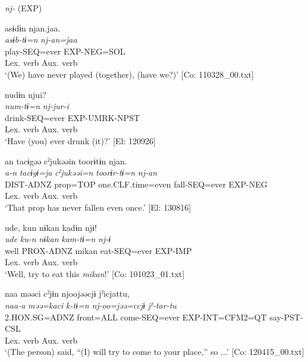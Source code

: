 \ea   \textit{nj-} (EXP) \label{ex:9.10}

\ea %
 \gllll  asɨdɨn  njan.jaa.\\
      \textit{asɨb-tɨ=n}  \textit{nj{}-an=jaa}\\
      play-SEQ=ever  EXP-NEG=SOL\\
      Lex. verb  Aux. verb\\
      \glt       ‘(We) have never played (together), (have we?)’ [Co: 110328\_00.txt]

\ex \label{ex:9.10b} %
      \gllll    nudɨn  njui?\\
      \textit{num-tɨ=n}  \textit{nj{}-jur-i}\\
      drink-SEQ=ever  EXP-UMRK-NPST\\
      Lex. verb  Aux. verb\\
      \glt       ‘Have (you) ever drunk (it)?’ [El: 120926]

\ex \label{ex:9.10c} %
     \gllll an  tacɨgəə  cˀjukəəin  toorɨtɨn  njan.\\
      \textit{a-n}  \textit{tacɨgɨ=ja}  \textit{cˀjukəəi=n}  \textit{toorɨr-tɨ=n}  \textit{nj{}-an}\\
      DIST-ADNZ  prop=TOP  one.CLF.time=even  fall-SEQ=ever  EXP-NEG\\
            Lex. verb  Aux. verb\\
      \glt       ‘That prop has never fallen even once.’ [El: 130816]

\ex \label{ex:9.10d} %
   \gllll   ude,  kun  nɨkan  kadɨn  njɨ!\\
      \textit{ude}  \textit{ku-n}  \textit{nɨkan}  \textit{kam-tɨ=n}  \textit{nj{}-ɨ}\\
      well  PROX-ADNZ  mikan  eat-SEQ=ever  EXP-IMP\\
            Lex. verb  Aux. verb\\
      \glt       ‘Well, try to eat this \textit{mikan}!’ [Co: 101023\_01.txt]

\ex \label{ex:9.10e} %
   \gllll naa  məəci  cˀjɨn  njoojəəcjɨ    jˀicjattu,\\
      \textit{naa-a}  \textit{məə=kaci}  \textit{k-tɨ=n}  \textit{nj{}-oo=jəə=ccjɨ}   \textit{jˀ-tar-tu}\\
      2.HON.SG=ADNZ  front=ALL  come-SEQ=ever  EXP-INT=CFM2=QT  say-PST-CSL\\
          Lex. verb  Aux. verb\\          
      \glt ‘(The person) said, “(I) will try to come to your place,” so ...’    [Co: 120415\_00.txt]
    \z
\z

